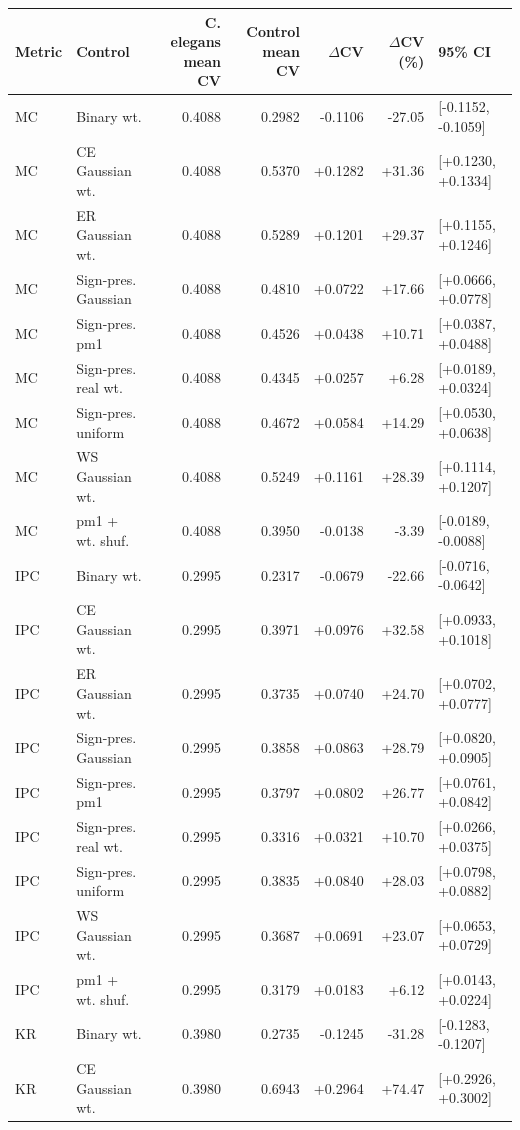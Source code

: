 \begin{tabular}{llrrrrl}
\toprule
Metric & Control & C. elegans mean CV & Control mean CV & $\Delta$CV & $\Delta$CV (\%) & 95\% CI \\
\midrule
MC & Binary wt. & 0.4088 & 0.2982 & -0.1106 & -27.05 & [-0.1152, -0.1059] \\
MC & CE Gaussian wt. & 0.4088 & 0.5370 & +0.1282 & +31.36 & [+0.1230, +0.1334] \\
MC & ER Gaussian wt. & 0.4088 & 0.5289 & +0.1201 & +29.37 & [+0.1155, +0.1246] \\
MC & Sign-pres. Gaussian & 0.4088 & 0.4810 & +0.0722 & +17.66 & [+0.0666, +0.0778] \\
MC & Sign-pres. pm1 & 0.4088 & 0.4526 & +0.0438 & +10.71 & [+0.0387, +0.0488] \\
MC & Sign-pres. real wt. & 0.4088 & 0.4345 & +0.0257 & +6.28 & [+0.0189, +0.0324] \\
MC & Sign-pres. uniform & 0.4088 & 0.4672 & +0.0584 & +14.29 & [+0.0530, +0.0638] \\
MC & WS Gaussian wt. & 0.4088 & 0.5249 & +0.1161 & +28.39 & [+0.1114, +0.1207] \\
MC & pm1 + wt. shuf. & 0.4088 & 0.3950 & -0.0138 & -3.39 & [-0.0189, -0.0088] \\
IPC & Binary wt. & 0.2995 & 0.2317 & -0.0679 & -22.66 & [-0.0716, -0.0642] \\
IPC & CE Gaussian wt. & 0.2995 & 0.3971 & +0.0976 & +32.58 & [+0.0933, +0.1018] \\
IPC & ER Gaussian wt. & 0.2995 & 0.3735 & +0.0740 & +24.70 & [+0.0702, +0.0777] \\
IPC & Sign-pres. Gaussian & 0.2995 & 0.3858 & +0.0863 & +28.79 & [+0.0820, +0.0905] \\
IPC & Sign-pres. pm1 & 0.2995 & 0.3797 & +0.0802 & +26.77 & [+0.0761, +0.0842] \\
IPC & Sign-pres. real wt. & 0.2995 & 0.3316 & +0.0321 & +10.70 & [+0.0266, +0.0375] \\
IPC & Sign-pres. uniform & 0.2995 & 0.3835 & +0.0840 & +28.03 & [+0.0798, +0.0882] \\
IPC & WS Gaussian wt. & 0.2995 & 0.3687 & +0.0691 & +23.07 & [+0.0653, +0.0729] \\
IPC & pm1 + wt. shuf. & 0.2995 & 0.3179 & +0.0183 & +6.12 & [+0.0143, +0.0224] \\
KR & Binary wt. & 0.3980 & 0.2735 & -0.1245 & -31.28 & [-0.1283, -0.1207] \\
KR & CE Gaussian wt. & 0.3980 & 0.6943 & +0.2964 & +74.47 & [+0.2926, +0.3002] \\

\end{tabular}
